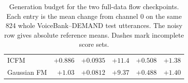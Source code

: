 \begin{table}[htbp]
\begin{tabular}{lrrrrr}
ICFM & \cellcolor{worstred}$+0.886$ & \cellcolor{bestblue}$+0.0935$ & \cellcolor{bestblue}$+11.4$ & \cellcolor{bestblue}$+0.508$ & \cellcolor{worstred}$+1.38$ \\
Gaussian FM & \cellcolor{bestblue}$+1.03$ & \cellcolor{worstred}$+0.0812$ & \cellcolor{worstred}$+9.37$ & \cellcolor{worstred}$+0.488$ & \cellcolor{bestblue}$+1.40$ \\
\bottomrule\end{tabular}
\caption{Generation budget for the two full-data flow checkpoints. Each entry is the mean change from channel 0 on the same 824 whole VoiceBank--DEMAND test utterances. The noisy row gives absolute reference means. Dashes mark incomplete score sets.}\label{tab:cfmse-budget}
\end{table}
